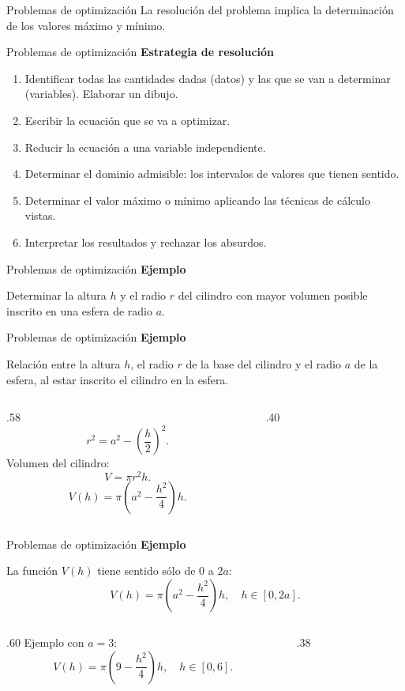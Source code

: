 \documentclass[original_version/main.tex]{subfiles}
\begin{document}
\begin{frame}{Problemas de optimización}
La resolución del problema implica la determinación de los valores máximo y mínimo.
\end{frame}
\begin{frame}{Problemas de optimización}
\small\textbf{Estrategia de resolución}
\begin{enumerate}
\item Identificar todas las cantidades dadas (datos) y las que se van a determinar (variables). Elaborar un dibujo.
\item Escribir la ecuación que se va a optimizar.
\item Reducir la ecuación a una variable independiente.
\item Determinar el dominio admisible: los intervalos de valores que tienen sentido.
\item Determinar el valor máximo o mínimo aplicando las técnicas de cálculo vistas.
\item Interpretar los resultados y rechazar los absurdos.
\end{enumerate}
\end{frame}
\begin{frame}{Problemas de optimización}
\textbf{Ejemplo}\par Determinar la altura $h$ y el radio $r$ del cilindro con mayor volumen posible inscrito en una esfera de radio $a$.
\end{frame}
\begin{frame}{Problemas de optimización}
\small\textbf{Ejemplo}\par Relación entre la altura $h$, el radio $r$ de la base del cilindro y el radio $a$ de la esfera, al estar inscrito el cilindro en la esfera.
\begin{columns}[c]
\begin{column}{.58\textwidth}
\[r^2=a^2-\left(\frac h2\right)^2.\]
Volumen del cilindro:
\[V=\pi r^2h.\]
\[V(h)=\pi\left(a^2-\frac{h^2}{4}\right)h.\]
\end{column}
\begin{column}{.40\textwidth}\end{column}
\end{columns}
\end{frame}
\begin{frame}{Problemas de optimización}
\small\textbf{Ejemplo}\par La función $V(h)$ tiene sentido sólo de $0$ a $2a$:
\[V(h)=\pi\left(a^2-\frac{h^2}{4}\right)h,\quad h\in[0,2a].\]
\begin{columns}[c]
\begin{column}{.60\textwidth}
Ejemplo con $a=3$:
\[V(h)=\pi\left(9-\frac{h^2}{4}\right)h,\quad h\in[0,6].\]
\end{column}
\begin{column}{.38\textwidth}\end{column}
\end{columns}
\end{frame}
\end{document}
